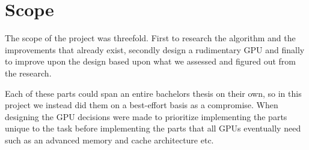 	\section{Scope}
		
		The scope of the project was threefold. First to research the algorithm
		and the improvements that already exist, secondly design a rudimentary GPU and
		finally to improve upon the design based upon what we assessed and
		figured out from the research.

		Each of these parts could span an entire bachelors thesis on their own, so in this
		project we instead did them on a best-effort basis as a compromise.
		When designing the GPU decisions were made to prioritize implementing the parts
		unique to the task before implementing the parts that all GPUs eventually need such
		as an advanced memory and cache architecture etc.

